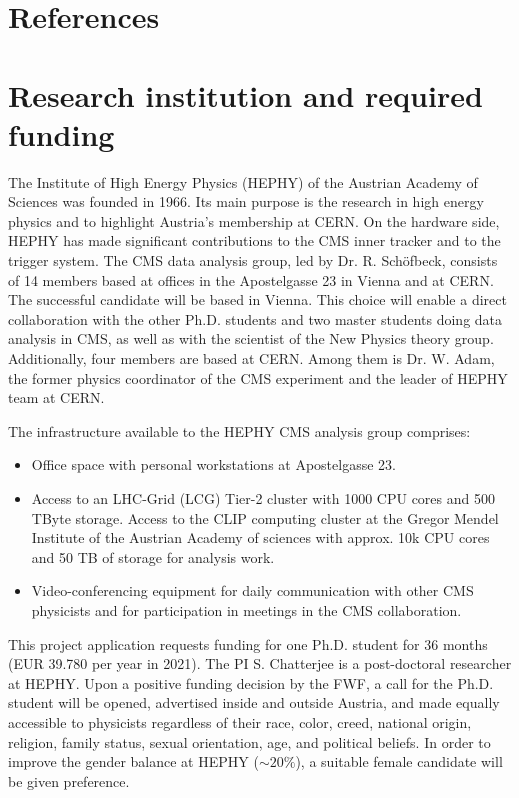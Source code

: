 \documentclass[a4paper,11pt]{article}
\begin{document}
\appendix
\renewcommand{\thesection}{Annex \arabic{section}} 

\clearpage
\section{References}
\renewcommand{\refname}{}
{
%


}

\newpage

\section{Research institution and required funding}

The Institute of High Energy Physics (HEPHY) of the Austrian Academy of Sciences was founded in 1966. 
Its main purpose is the research in high energy physics and to highlight Austria's membership at CERN. 
On the hardware side, HEPHY has made significant contributions to the CMS inner tracker and to the trigger system. 
The CMS data analysis group, led by Dr. R. Sch{\"o}fbeck, consists of 14 members based at offices in the Apostelgasse 23 in Vienna and at CERN. The successful candidate will be based in Vienna. 
This choice will enable a direct collaboration with the other Ph.D. students and two master students doing data analysis in CMS, as well as with the scientist of the New Physics theory group.
Additionally, four members are based at CERN. 
Among them is Dr. W. Adam, the former physics coordinator of the CMS experiment and the leader of HEPHY team at CERN.

The infrastructure available to the HEPHY CMS analysis group comprises:
\begin{itemize}
\item Office space with personal workstations at Apostelgasse 23.
\item Access to an LHC-Grid (LCG) Tier-2 cluster with 1000 CPU cores and 500 TByte storage. Access to the CLIP computing cluster at the Gregor Mendel Institute of the Austrian Academy of sciences with approx. 10k CPU cores and 50 TB of
storage for analysis work.
\item Video-conferencing equipment for daily communication with other CMS physicists and for participation in meetings in the CMS collaboration.
\end{itemize}

This project application requests funding for one Ph.D. student for 36
months (EUR 39.780 per year in 2021). 
The PI S. Chatterjee is a post-doctoral researcher at HEPHY.
Upon a positive funding decision by the FWF, a call for the Ph.D. student will be opened, advertised inside and outside Austria, and made equally accessible to physicists regardless of their race, color, creed, national origin, religion, family status, sexual orientation, age, and political beliefs. 
In order to improve the gender balance at HEPHY ($\sim 20\%$), a suitable female candidate will be given preference.
\end{document}
